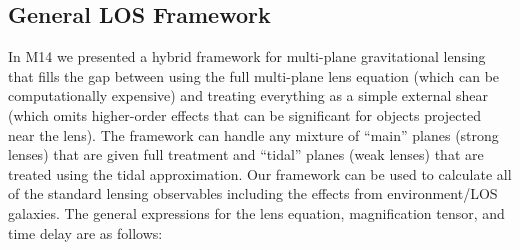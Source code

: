 \subsection{General LOS Framework}
In M14 we presented a hybrid framework for multi-plane gravitational lensing that fills the gap between using the full multi-plane lens equation (which can be computationally expensive) and treating everything as a simple external shear (which omits higher-order effects that can be significant for objects projected near the lens). The framework can handle any mixture of ``main'' planes (strong lenses) that are given full treatment and ``tidal'' planes (weak lenses) that are treated using the tidal approximation. Our framework can be used to calculate all of the standard lensing observables including the effects from environment/LOS galaxies. The general expressions for the lens equation, magnification tensor, and time delay are as follows:
\setlength{\arraycolsep}{2pt}